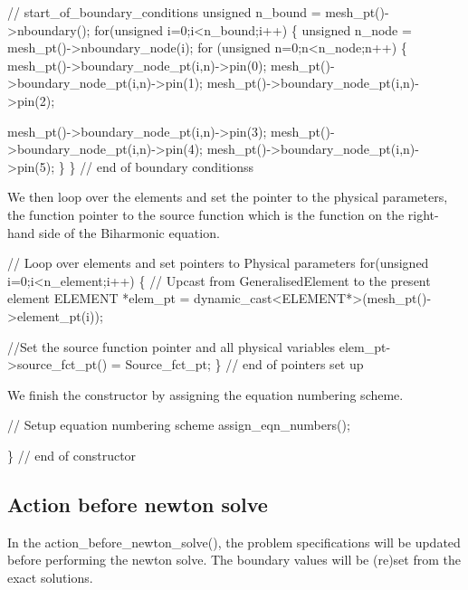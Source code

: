 \begin{DoxyCodeInclude}
 \textcolor{comment}{// start\_of\_boundary\_conditions}
 \textcolor{keywordtype}{unsigned} n\_bound = mesh\_pt()->nboundary();
 \textcolor{keywordflow}{for}(\textcolor{keywordtype}{unsigned} i=0;i<n\_bound;i++)
  \{
   \textcolor{keywordtype}{unsigned} n\_node = mesh\_pt()->nboundary\_node(i);
   \textcolor{keywordflow}{for} (\textcolor{keywordtype}{unsigned} n=0;n<n\_node;n++)
    \{
     mesh\_pt()->boundary\_node\_pt(i,n)->pin(0); 
     mesh\_pt()->boundary\_node\_pt(i,n)->pin(1); 
     mesh\_pt()->boundary\_node\_pt(i,n)->pin(2);

     mesh\_pt()->boundary\_node\_pt(i,n)->pin(3);
     mesh\_pt()->boundary\_node\_pt(i,n)->pin(4);
     mesh\_pt()->boundary\_node\_pt(i,n)->pin(5);
    \}
  \}
 \textcolor{comment}{// end of boundary conditionss }

\end{DoxyCodeInclude}


We then loop over the elements and set the pointer to the physical parameters, the function pointer to the source function which is the function on the right-\/hand side of the Biharmonic equation.


\begin{DoxyCodeInclude}
 \textcolor{comment}{// Loop over elements and set pointers to Physical parameters}
 \textcolor{keywordflow}{for}(\textcolor{keywordtype}{unsigned} i=0;i<n\_element;i++)
  \{
   \textcolor{comment}{// Upcast from GeneralisedElement to the present element}
   ELEMENT *elem\_pt = \textcolor{keyword}{dynamic\_cast<}ELEMENT*\textcolor{keyword}{>}(mesh\_pt()->element\_pt(i));
   
   \textcolor{comment}{//Set the source function pointer and all physical variables}
   elem\_pt->source\_fct\_pt() = Source\_fct\_pt;
  \}
 \textcolor{comment}{// end of pointers set up}

\end{DoxyCodeInclude}


We finish the constructor by assigning the equation numbering scheme. 
\begin{DoxyCodeInclude}
 \textcolor{comment}{// Setup equation numbering scheme}
 assign\_eqn\_numbers();

\} \textcolor{comment}{// end of constructor}

\end{DoxyCodeInclude}




\hypertarget{index_actionbefore}{}\subsection{Action before newton solve}\label{index_actionbefore}
In the {\ttfamily action\+\_\+before\+\_\+newton\+\_\+solve()}, the problem specifications will be updated before performing the newton solve. The boundary values will be (re)set from the exact solutions.

